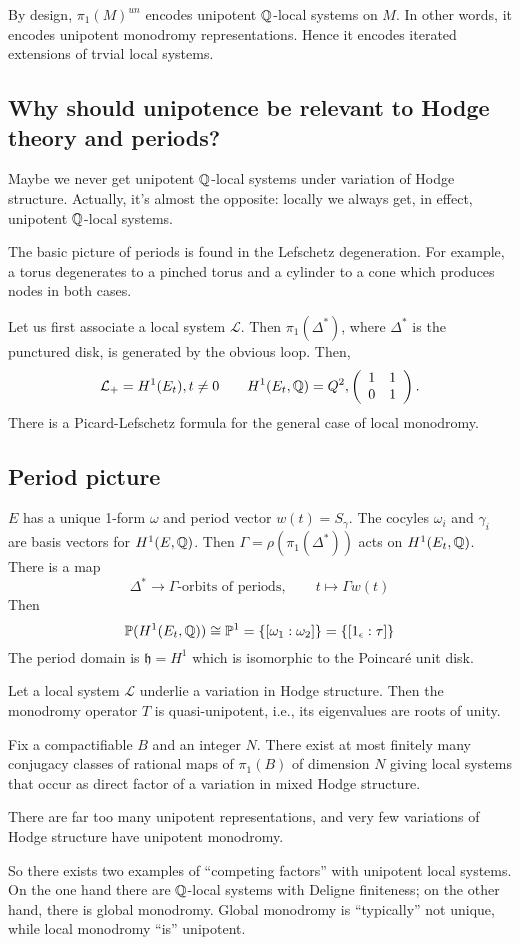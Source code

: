 By design, $\pi_1(M)^{un}$ encodes unipotent $\mathbb{Q}$-local systems on $M$. In other words, it encodes unipotent monodromy representations. Hence it encodes iterated extensions of trvial local systems.

\subsection{Why should unipotence be relevant to Hodge theory and periods?}
Maybe we never get unipotent $\mathbb{Q}$-local systems under variation of Hodge structure. Actually, it's almost the opposite: locally we always get, in effect, unipotent $\mathbb{Q}$-local systems. 

The basic picture of periods is found in the Lefschetz degeneration. For example, a torus degenerates to a pinched torus and a cylinder to a cone which produces nodes in both cases.

Let us first associate a local system $\mathcal{L}$. Then $\pi_1(\Delta^*)$, where $\Delta^*$ is the punctured disk, is generated by the obvious loop. Then,
\[
\mathcal{L}_{+} = H^1(E_t), t \neq 0 \qquad H^1(E_t, \mathbb{Q}) = Q^2, \left(\begin{array}{cc}
1 & 1 \\
0 & 1
\end{array}\right).
\]
There is a Picard-Lefschetz formula for the general case of local monodromy.

\subsection{Period picture}
$E$ has a unique 1-form $\omega$ and period vector $w(t) = S_{\gamma}$. The cocyles $\omega_i$ and $\gamma_i$ are basis vectors for $H^1(E, \mathbb{Q})$. Then $\Gamma = \rho(\pi_1(\Delta^*))$ acts on $H^1(E_t, \mathbb{Q})$. There is a map
\[
\Delta^* \to \textrm{$\Gamma$-orbits of periods}, \qquad t \mapsto \Gamma w(t)
\]
Then
\[
\mathbb{P}(H^1(E_t, \mathbb{Q})) \cong \mathbb{P}^1 = \{[\omega_1 : \omega_2]\} = \{[1_{\epsilon} : \tau]\}
\]
The period domain is $\mathfrak{h} = H^1$ which is isomorphic to the Poincar\'e unit disk.

\begin{thm}
Let a local system $\mathcal{L}$ underlie a variation in Hodge structure. Then the monodromy operator $T$ is quasi-unipotent, i.e., its eigenvalues are roots of unity.
\end{thm}
\begin{thm}
Fix a compactifiable $B$ and an integer $N$. There exist at most finitely many conjugacy classes of rational maps of $\pi_1(B)$ of dimension $N$ giving local systems that occur as direct factor of a variation in mixed Hodge structure.
\end{thm}
\begin{rem} 
There are far too many unipotent representations, and very few variations of Hodge structure have unipotent monodromy.
\end{rem}
\noindent So there exists two examples of ``competing factors'' with unipotent local systems. On the one hand there are $\mathbb{Q}$-local systems with Deligne finiteness; on the other hand, there is global monodromy. Global monodromy is ``typically'' not unique, while local monodromy ``is'' unipotent.

